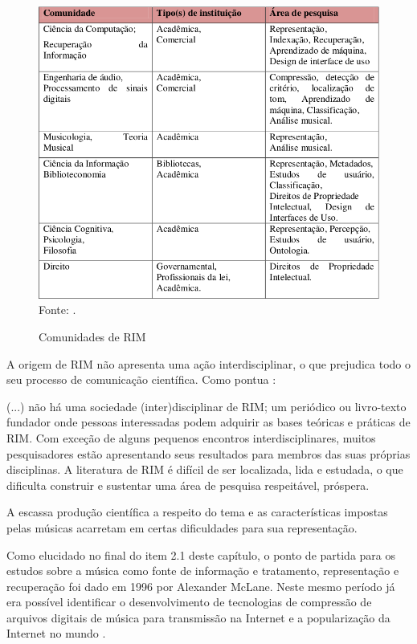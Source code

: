 \begin{figure}[!htb]
   \centering
   \caption{Comunidades de RIM}\label{fig:comunidadeRim} 
   \includegraphics[scale=0.4]{figuras/comunidadeRim.png}
   Fonte: \cite{futrelle&downie2002}.
\end{figure}

A origem de RIM não apresenta uma ação interdisciplinar, o que prejudica todo o seu processo de comunicação científica. Como pontua :

\begin{citacao}
(...) não há uma sociedade (inter)disciplinar de RIM; um periódico ou livro-texto fundador onde pessoas interessadas podem adquirir as bases teóricas e práticas de RIM. Com exceção de alguns pequenos encontros interdisciplinares, muitos pesquisadores estão apresentando seus resultados para membros das suas próprias disciplinas. A literatura de RIM é difícil de ser localizada, lida e estudada, o que dificulta construir e sustentar uma área de pesquisa respeitável, próspera.
\end{citacao}

A escassa produção científica a respeito do tema e as características impostas pelas músicas acarretam em certas dificuldades para sua representação.

Como elucidado no final do item 2.1 deste capítulo, o ponto de partida para os estudos sobre a música como fonte de informação e tratamento, representação e recuperação foi dado em 1996 por Alexander McLane. Neste mesmo período já era possível identificar o desenvolvimento de tecnologias de compressão de arquivos digitais de música para transmissão na Internet e a popularização da Internet no mundo \cite{santini&souza2007}.

